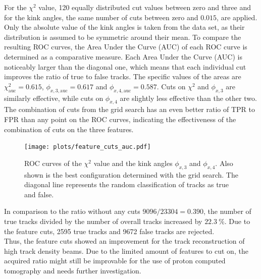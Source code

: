For the $\chi^2$ value, 120 equally distributed cut values between zero and three and for the kink angles, the same number of cuts between
zero and $0.015$, are applied. Only the absolute value of the
kink angles is taken from the data set, as their distribution is assumed to be symmetric around their mean. To compare the resulting ROC curves, the Area Under the Curve (AUC)
of each ROC curve is determined as a comparative measure.
Each Area Under the Curve (AUC) is noticeably larger than the diagonal
one, which means that each individual cut improves the ratio of true to false tracks. The specific values of the areas are $\chi^2_{\text{auc}} = 0.615$,
$\phi_{x,3,\text{auc}} = 0.617$ and $\phi_{x,4,\text{auc}} = 0.587$. Cuts on $\chi^2$ and $\phi_{x,3}$ are similarly effective, while cuts on $\phi_{x,4}$ are slightly
less effective than the other two. The combination of cuts from the grid search has an even better ratio of TPR to FPR than any point on the ROC curves, indicating the
effectiveness of the combination of cuts on the three features.

\begin{figure}[H]
  \centering
  \texttt{[image: plots/feature\_cuts\_auc.pdf]}
  \caption{ROC curves of the $\chi^2$ value and the kink angles $\phi_{x,3}$ and $\phi_{x,4}$. Also shown is the best configuration determined with the grid search. The diagonal
  line represents the random classification of tracks as true and false.}
  \label{fig:feature_grid}
\end{figure}

In comparison to the ratio without any cuts $9096/23304 = 0.390$, the number of true tracks divided by the number of overall tracks increased by $\SI{22.3}{\percent}$. Due to
the feature cuts, 2595 true tracks and 9672 false tracks are rejected. \\
Thus, the feature cuts showed an improvement for the track reconstruction of high track density beams. Due to the limited amount of features to cut on, the acquired ratio
might still be improvable for the use of proton computed tomography and needs further investigation.
